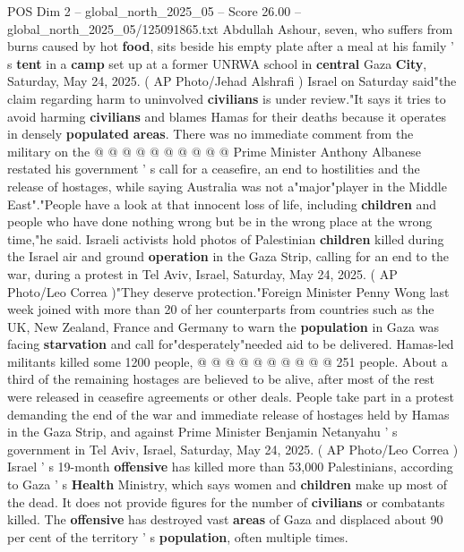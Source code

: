 \begin{textsample}{POS Dim 2 – global\_north\_2025\_05 – Score 26.00 – global\_north\_2025\_05/125091865.txt}
Abdullah Ashour, seven, who suffers from burns caused by hot \textbf{food}, sits beside his empty plate after a meal at his family ' s \textbf{tent} in a \textbf{camp} set up at a former UNRWA school in \textbf{central} Gaza \textbf{City}, Saturday, May 24, 2025. ( AP Photo/Jehad Alshrafi ) Israel on Saturday said"the claim regarding harm to uninvolved \textbf{civilians} is under review."It says it tries to avoid harming \textbf{civilians} and blames Hamas for their deaths because it operates in densely \textbf{populated} \textbf{areas}.
There was no immediate comment from the military on the @ @ @ @ @ @ @ @ @ @ Prime Minister Anthony Albanese restated his government ' s call for a ceasefire, an end to hostilities and the release of hostages, while saying Australia was not a"major"player in the Middle East"."People have a look at that innocent loss of life, including \textbf{children} and people who have done nothing wrong but be in the wrong place at the wrong time,"he said.
Israeli activists hold photos of Palestinian \textbf{children} killed during the Israel air and ground \textbf{operation} in the Gaza Strip, calling for an end to the war, during a protest in Tel Aviv, Israel, Saturday, May 24, 2025. ( AP Photo/Leo Correa )"They deserve protection."Foreign Minister Penny Wong last week joined with more than 20 of her counterparts from countries such as the UK, New Zealand, France and Germany to warn the \textbf{population} in Gaza was facing \textbf{starvation} and call for"desperately"needed aid to be delivered.
Hamas-led militants killed some 1200 people, @ @ @ @ @ @ @ @ @ @ 251 people.
About a third of the remaining hostages are believed to be alive, after most of the rest were released in ceasefire agreements or other deals.
People take part in a protest demanding the end of the war and immediate release of hostages held by Hamas in the Gaza Strip, and against Prime Minister Benjamin Netanyahu ' s government in Tel Aviv, Israel, Saturday, May 24, 2025. ( AP Photo/Leo Correa ) Israel ' s 19-month \textbf{offensive} has killed more than 53,000 Palestinians, according to Gaza ' s \textbf{Health} Ministry, which says women and \textbf{children} make up most of the dead.
It does not provide figures for the number of \textbf{civilians} or combatants killed.
The \textbf{offensive} has destroyed vast \textbf{areas} of Gaza and displaced about 90 per cent of the territory ' s \textbf{population}, often multiple times.

\end{textsample}
